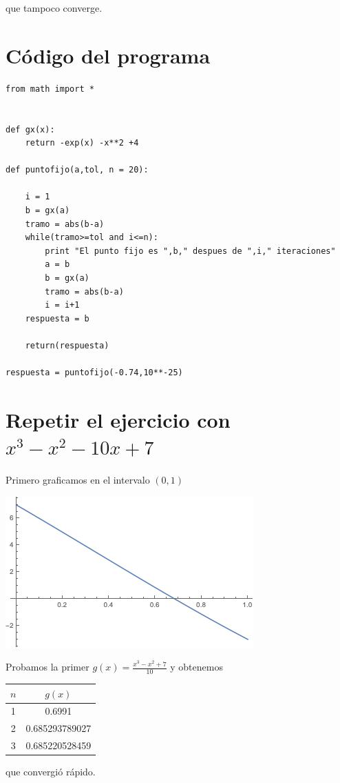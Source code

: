 \documentclass{article}
\begin{document}
que tampoco converge.

\section{Código del programa}

\begin{lstlisting}
from math import *


def gx(x):
    return -exp(x) -x**2 +4

def puntofijo(a,tol, n = 20):

    i = 1
    b = gx(a)
    tramo = abs(b-a)
    while(tramo>=tol and i<=n):
        print "El punto fijo es ",b," despues de ",i," iteraciones"
        a = b
        b = gx(a)
        tramo = abs(b-a)
        i = i+1
    respuesta = b

    return(respuesta)

respuesta = puntofijo(-0.74,10**-25)
\end{lstlisting}

\section{Repetir el ejercicio con $x^3-x^2-10x+7$}
Primero graficamos en el intervalo $(0,1)$
\begin{center}
    \includegraphics[scale=0.75]{grafica2.png}
\end{center}
Probamos la primer $g(x)= \frac{x^3-x^2+7}{10}$ y obtenemos
\begin{center}
    \begin{tabular}{||c c||} 
    \hline
    $n$ & $g(x)$\\ [0.5ex] 
    \hline
    1 & 0.6991 \\
    \hline
    2 & 0.685293789027 \\
    \hline
    3 & 0.685220528459 \\ [1ex]
    \hline
   \end{tabular}
\end{center}
que convergió rápido.
\end{document}
